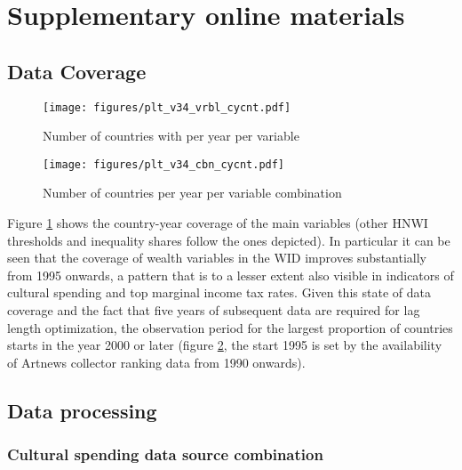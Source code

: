 \documentclass[11pt, authoryear]{elsarticle}
\author{Johannes }
\date{\today}
\title{}
\begin{document}
\section{Supplementary online materials}


\appendix
\setcounter{page}{1}


\renewcommand{\thesubsection}{\Alph{subsection}}



\subsection{Data Coverage}
\label{app_data_coverage}
\begin{figure}[htbp]
\centering
\texttt{[image: figures/plt\_v34\_vrbl\_cycnt.pdf]}
\caption{\label{fig:vrbl_cycnt}Number of countries with per year per variable}
\end{figure}



\begin{figure}[htbp]
\centering
\texttt{[image: figures/plt\_v34\_cbn\_cycnt.pdf]}
\caption{\label{fig:cbn_cycnt}Number of countries per year per variable combination}
\end{figure}



Figure \ref{fig:vrbl_cycnt} shows the country-year coverage of the main variables (other HNWI thresholds and inequality shares follow the ones depicted).
In particular it can be seen that the coverage of wealth variables in the WID improves substantially from 1995 onwards, a pattern that is to a lesser extent also visible in indicators of cultural spending and top marginal income tax rates.
Given this state of data coverage and the fact that five years of subsequent data are required for lag length optimization, the observation period for the largest proportion of countries starts in the year 2000 or later  (figure \ref{fig:cbn_cycnt}, the start 1995 is set by the availability of Artnews collector ranking data from 1990 onwards).





\subsection{Data processing}
\label{app_data_processing}
\subsubsection{Cultural spending data source combination}
\end{document}
